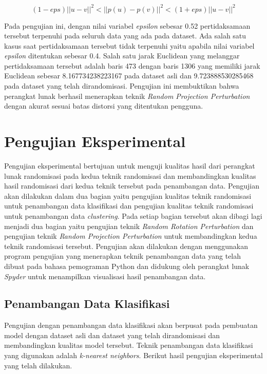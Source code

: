 \begin{equation}
	(1-eps)||u - v||^{2}<||p(u) - p(v)||^{2}<(1+eps)||u - v||^{2}
\end{equation}

Pada pengujian ini, dengan nilai variabel \textit{epsilon} sebesar 0.52 pertidaksamaan tersebut terpenuhi pada seluruh data yang ada pada dataset. Ada salah satu kasus saat pertidaksamaan tersebut tidak terpenuhi yaitu apabila nilai variabel \textit{epsilon} ditentukan sebesar 0.4. Salah satu jarak Euclidean yang melanggar pertidaksamaan tersebut adalah baris 473 dengan baris 1306 yang memiliki jarak Euclidean sebesar 8.167734238223167 pada dataset asli dan 9.723888530285468 pada dataset yang telah dirandomisasi. Pengujian ini membuktikan bahwa perangkat lunak berhasil menerapkan teknik \textit{Random Projection Perturbation} dengan akurat sesuai batas distorsi yang ditentukan pengguna.

\section{Pengujian Eksperimental}
\label{sec:pengujianeksperimental}

Pengujian eksperimental bertujuan untuk menguji kualitas hasil dari perangkat lunak randomisasi pada kedua teknik randomisasi dan membandingkan kualitas hasil randomisasi dari kedua teknik tersebut pada penambangan data. Pengujian akan dilakukan dalam dua bagian yaitu pengujian kualitas teknik randomisasi untuk penambangan data klasifikasi dan pengujian kualitas teknik randomisasi untuk penambangan data \textit{clustering}. Pada setiap bagian tersebut akan dibagi lagi menjadi dua bagian yaitu pengujian teknik \textit{Random Rotation Perturbation} dan pengujian teknik \textit{Random Projection Perturbation} untuk membandingkan kedua teknik randomisasi tersebut. Pengujian akan dilakukan dengan menggunakan program pengujian yang menerapkan teknik penambangan data yang telah dibuat pada bahasa pemograman Python dan didukung oleh perangkat lunak \textit{Spyder} untuk menampilkan visualisasi hasil penambangan data.

\subsection{Penambangan Data Klasifikasi}
\label{sec:pengujian-klasifikasi}
Pengujian dengan penambangan data klasifikasi akan berpusat pada pembuatan model dengan dataset asli dan dataset yang telah dirandomisasi dan membandingkan kualitas model tersebut. Teknik penambangan data klasifikasi yang digunakan adalah \textit{k-nearest neighbors}. Berikut hasil pengujian eksperimental yang telah dilakukan.

